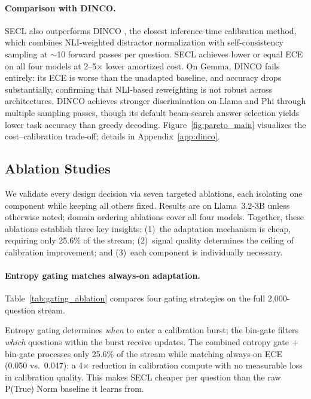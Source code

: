 \documentclass[11pt]{article}
\begin{document}
\paragraph{Comparison with DINCO.}
SECL also outperforms DINCO \cite{wang_calibrating_2025}, the closest inference-time calibration method, which combines NLI-weighted distractor normalization with self-consistency sampling at ${\sim}$10 forward passes per question. SECL achieves lower or equal ECE on all four models at 2--5$\times$ lower amortized cost. On Gemma, DINCO fails entirely: its ECE is worse than the unadapted baseline, and accuracy drops substantially, confirming that NLI-based reweighting is not robust across architectures. DINCO achieves stronger discrimination on Llama and Phi through multiple sampling passes, though its default beam-search answer selection yields lower task accuracy than greedy decoding. Figure~\ref{fig:pareto_main} visualizes the cost--calibration trade-off; details in Appendix~\ref{app:dinco}.

\subsection{Ablation Studies} \label{sec:ablation_studies}

We validate every design decision via seven targeted ablations, each isolating one component while keeping all others fixed. Results are on Llama~3.2-3B unless otherwise noted; domain ordering ablations cover all four models. Together, these ablations establish three key insights: (1)~the adaptation mechanism is cheap, requiring only 25.6\% of the stream; (2)~signal quality determines the ceiling of calibration improvement; and (3)~each component is individually necessary.

\paragraph{Entropy gating matches always-on adaptation.}
Table~\ref{tab:gating_ablation} compares four gating strategies on the full 2{,}000-question stream.

Entropy gating determines \emph{when} to enter a calibration burst; the bin-gate filters \emph{which} questions within the burst receive updates. The combined entropy gate + bin-gate processes only 25.6\% of the stream while matching always-on ECE (0.050 vs.\ 0.047): a 4$\times$ reduction in calibration compute with no measurable loss in calibration quality. This makes SECL cheaper per question than the raw P(True) Norm baseline it learns from.
\end{document}
